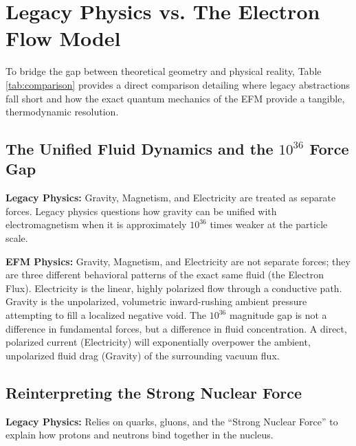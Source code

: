 \documentclass[11pt, a4paper]{article}
\begin{document}
\clearpage
\section{Legacy Physics vs. The Electron Flow Model}
  To bridge the gap between theoretical geometry and physical reality, Table \ref{tab:comparison} provides a direct comparison detailing where legacy abstractions fall short and how the exact quantum mechanics of the EFM provide a tangible, thermodynamic resolution.

  \subsection{The Unified Fluid Dynamics and the \texorpdfstring{$10^{36}$}{10\textasciicircum 36} Force Gap}
  \textbf{Legacy Physics:} Gravity, Magnetism, and Electricity are treated as separate forces. Legacy physics questions how gravity can be unified with electromagnetism when it is approximately $10^{36}$ times weaker at the particle scale.
  
  \textbf{EFM Physics:} Gravity, Magnetism, and Electricity are not separate forces; they are three different behavioral patterns of the exact same fluid (the Electron Flux). Electricity is the linear, highly polarized flow through a conductive path. Gravity is the unpolarized, volumetric inward-rushing ambient pressure attempting to fill a localized negative void. The $10^{36}$ magnitude gap is not a difference in fundamental forces, but a difference in fluid concentration. A direct, polarized current (Electricity) will exponentially overpower the ambient, unpolarized fluid drag (Gravity) of the surrounding vacuum flux.

  \subsection{Reinterpreting the Strong Nuclear Force}
  \textbf{Legacy Physics:} Relies on quarks, gluons, and the ``Strong Nuclear Force'' to explain how protons and neutrons bind together in the nucleus.
  
\end{document}
